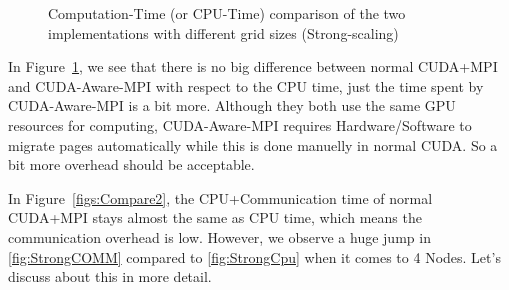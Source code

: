 \documentclass[article]{scrartcl}
\begin{document}
\begin{figure}[htpb!]
	\caption{Computation-Time (or CPU-Time) comparison of the two implementations with different grid sizes (Strong-scaling)}
	\label{figs:Compare1}
\end{figure}

In Figure~\ref{figs:Compare1}, we see that there is no big difference between normal CUDA+MPI and CUDA-Aware-MPI with respect to the CPU time, just the time spent by CUDA-Aware-MPI is a bit more. Although they both use the same GPU resources for computing, CUDA-Aware-MPI requires Hardware/Software to migrate pages automatically while this is done manuelly in normal CUDA. So a bit more overhead should be acceptable. 

In Figure~\ref{figs:Compare2}, the CPU+Communication time of normal CUDA+MPI stays almost the same as CPU time, which means the communication overhead is low. However, we observe a huge jump in \ref{fig:StrongCOMM} compared to \ref{fig:StrongCpu} when it comes to 4 Nodes. Let's discuss about this in more detail. 
\end{document}
